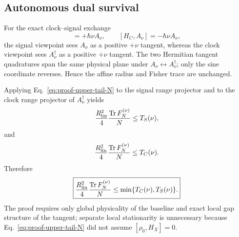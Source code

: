 \subsection{Autonomous dual survival}
\label{supp:dual-survival-full}

For the exact clock--signal exchange
\begin{equation}
[H_S,A_\nu]=+\hbar\nu A_\nu,
\qquad
[H_C,A_\nu]=-\hbar\nu A_\nu,
\end{equation}
the signal viewpoint sees $A_\nu$ as a positive $+\nu$ tangent, whereas the clock viewpoint sees $A_\nu^\dagger$ as a positive $+\nu$ tangent. The two Hermitian tangent quadratures span the same physical plane under $A_\nu\leftrightarrow A_\nu^\dagger$; only the sine coordinate reverses. Hence the affine radius and Fisher trace are unchanged.

Applying Eq.~\eqref{eq:proof-upper-tail-N} to the signal range projector and to the clock range projector of $A_\nu^\dagger$ yields
\begin{equation}
\frac{R_{\rm lin}^2}{4}\frac{\operatorname{Tr} F_N^{(\nu)}}{N}
\le T_S(\nu),
\end{equation}
and
\begin{equation}
\frac{R_{\rm lin}^2}{4}\frac{\operatorname{Tr} F_N^{(\nu)}}{N}
\le T_C(\nu).
\end{equation}
Therefore
\begin{equation}
\boxed{
\frac{R_{\rm lin}^2}{4}\frac{\operatorname{Tr} F_N^{(\nu)}}{N}
\le\min\{T_C(\nu),T_S(\nu)\}.
}
\end{equation}
The proof requires only global physicality of the baseline and exact local gap structure of the tangent; separate local stationarity is unnecessary because Eq.~\eqref{eq:proof-upper-tail-N} did not assume $[\rho_0,H_X]=0$.
